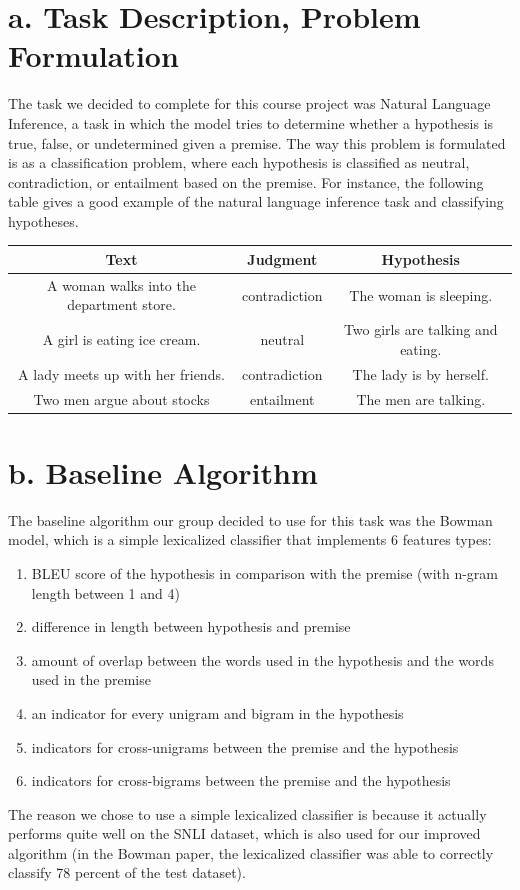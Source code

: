 \documentclass[12pt,letterpaper]{article}
\begin{document}
\section*{a. Task Description, Problem Formulation}
The task we decided to complete for this course project was Natural Language Inference, a task in which the model tries to determine whether a hypothesis is true, false, or undetermined given a premise. The way this problem is formulated is as a classification problem, where each hypothesis is classified as neutral, contradiction, or entailment based on the premise. For instance, the following table gives a good example of the natural language inference task and classifying hypotheses.
\begin{center}
    \begin{tabular}{| c | c | c |}
        \hline
        Text & Judgment & Hypothesis \\ \hline
        A woman walks into the department store. & contradiction & The woman is sleeping.
        \\ \hline
        A girl is eating ice cream. & neutral & Two girls are talking and eating. \\ \hline
        A lady meets up with her friends. & contradiction & The lady is by herself. \\ \hline
        Two men argue about stocks & entailment & The men are talking. \\ \hline
    \end{tabular}
\end{center}
\section*{b. Baseline Algorithm}
The baseline algorithm our group decided to use for this task was the Bowman model, which is a simple lexicalized classifier that implements 6 features types: 
\begin{enumerate}
    \item BLEU score of the hypothesis in comparison with the premise (with n-gram length between 1 and 4)
    \item difference in length between hypothesis and premise
    \item amount of overlap between the words used in the hypothesis and the words used in the premise
    \item an indicator for every unigram and bigram in the hypothesis
    \item indicators for cross-unigrams between the premise and the hypothesis
    \item indicators for cross-bigrams between the premise and the hypothesis
\end{enumerate}
The reason we chose to use a simple lexicalized classifier is because it actually performs quite well on the SNLI dataset, which is also used for our improved algorithm (in the Bowman paper, the lexicalized classifier was able to correctly classify 78 percent of the test dataset). 
\end{document}
